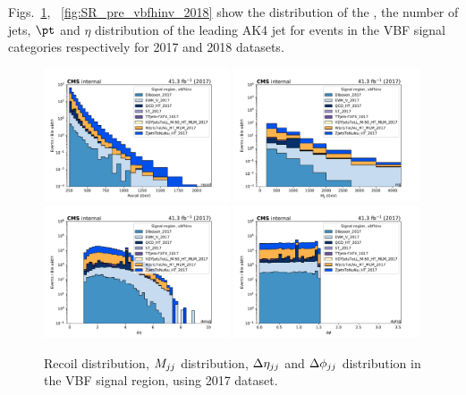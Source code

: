 Figs.~\ref{fig:SR_pre_vbfhinv_2017}, ~\ref{fig:SR_pre_vbfhinv_2018}
show the distribution of the \ETmiss, the number of
jets, $\pt$ and $\eta$ distribution of the leading AK4 jet for events
in the VBF signal categories respectively for 2017 and 2018 datasets.

\begin{figure}[htbp]
    \begin{center}
        \includegraphics[width=0.49\textwidth]{fig/datamc/sr_vbf/sr_vbf_recoil_losf_2017.pdf}
        \includegraphics[width=0.49\textwidth]{fig/datamc/sr_vbf/sr_vbf_mjj_losf_2017.pdf} \\
        \includegraphics[width=0.49\textwidth]{fig/datamc/sr_vbf/sr_vbf_detajj_losf_2017.pdf}
        \includegraphics[width=0.49\textwidth]{fig/datamc/sr_vbf/sr_vbf_dphijj_losf_2017.pdf}
    \end{center}
    \caption{Recoil distribution, $M_{jj}$ distribution, $\Delta \eta_{jj}$ and $\Delta \phi_{jj}$
    distribution in the VBF signal region, using 2017 dataset.}
    \label{fig:SR_pre_vbfhinv_2017}
\end{figure}

